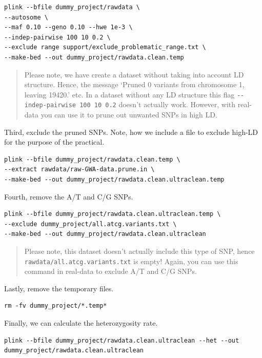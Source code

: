 \documentclass[
]{book}
\newcommand{\passthrough}[1]{#1}
\begin{document}
\begin{lstlisting}
plink --bfile dummy_project/rawdata \
--autosome \
--maf 0.10 --geno 0.10 --hwe 1e-3 \
--indep-pairwise 100 10 0.2 \
--exclude range support/exclude_problematic_range.txt \
--make-bed --out dummy_project/rawdata.clean.temp
\end{lstlisting}

\begin{quote}
Please note, we have create a dataset without taking into account LD structure. Hence, the message `Pruned 0 variants from chromosome 1, leaving 19420.' etc. In a dataset without any LD structure this flag \passthrough{\lstinline!--indep-pairwise 100 10 0.2!} doesn't actually work. However, with real-data you can use it to prune out unwanted SNPs in high LD.
\end{quote}

Third, exclude the pruned SNPs. Note, how we include a file to exclude high-LD for the purpose of the practical.

\begin{lstlisting}
plink --bfile dummy_project/rawdata.clean.temp \
--extract rawdata/raw-GWA-data.prune.in \
--make-bed --out dummy_project/rawdata.clean.ultraclean.temp
\end{lstlisting}

Fourth, remove the A/T and C/G SNPs.

\begin{lstlisting}
plink --bfile dummy_project/rawdata.clean.ultraclean.temp \
--exclude dummy_project/all.atcg.variants.txt \
--make-bed --out dummy_project/rawdata.clean.ultraclean
\end{lstlisting}

\begin{quote}
Please note, this dataset doesn't actually include this type of SNP, hence \passthrough{\lstinline!rawdata/all.atcg.variants.txt!} is empty! Again, you can use this command in real-data to exclude A/T and C/G SNPs.
\end{quote}

Lastly, remove the temporary files.

\begin{lstlisting}
rm -fv dummy_project/*.temp*
\end{lstlisting}

Finally, we can calculate the heterozygosity rate.

\begin{lstlisting}
plink --bfile dummy_project/rawdata.clean.ultraclean --het --out dummy_project/rawdata.clean.ultraclean
\end{lstlisting}
\end{document}
